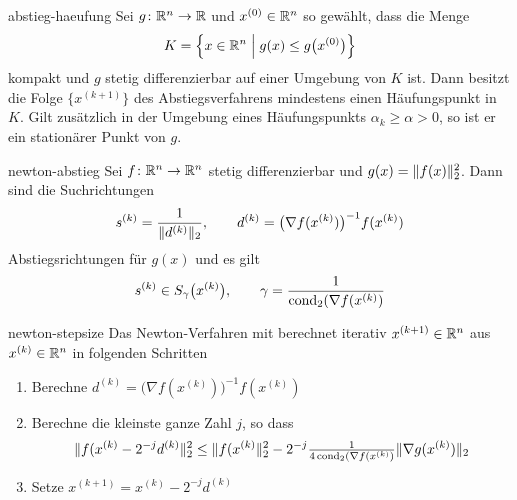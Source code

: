 \begin{Satz}{abstieg-haeufung}
  Sei $g\colon \mathbb R^n\to \mathbb R$ und $x^{(0)} \in\mathbb R^n$ so gewählt, dass die Menge
  \begin{gather}
    K = \Bigl\{x\in\mathbb R^n \; \Big| \; g(x) \le g\bigl(x^{(0)}\bigr) \Bigr\}
  \end{gather}
  kompakt und $g$ stetig differenzierbar auf einer Umgebung von $K$
  ist. Dann besitzt die Folge $\{x^{(k+1)}\}$ des Abstiegsverfahrens
  mindestens einen Häufungspunkt in $K$. Gilt zusätzlich in der
  Umgebung eines Häufungspunkts $\alpha_k \ge \alpha>0$, so ist er
  ein stationärer Punkt von $g$.
\end{Satz}

\begin{Lemma}{newton-abstieg}
  Sei $f\colon \mathbb R^n\to \mathbb R^n$ stetig differenzierbar und
  $g(x) = \lVert f(x)\rVert_2^2$.  Dann sind die Suchrichtungen
  \begin{gather}
    s^{(k)} = \frac1{\lVert d^{(k)}\rVert_2},
    \qquad d^{(k)} = \bigl(\nabla f(x^{(k)})\bigr)^{-1}f(x^{(k)})
  \end{gather}
  Abstiegsrichtungen für $g(x)$ und es gilt
  \begin{gather}
    s^{(k)} \in S_\gamma\bigl(x^{(k)}\bigr),
    \qquad
    \gamma = \frac{1}{\operatorname{cond}_2(\nabla f(x^{(k)})}
  \end{gather}
\end{Lemma}

\begin{Definition}{newton-stepsize}
  Das Newton-Verfahren mit  berechnet iterativ
  $x^{(k+1)}\in \mathbb R^n$ aus $x^{(k)}\in \mathbb R^n$ in folgenden Schritten
  \begin{enumerate}
  \item Berechne $d^{(k)} = \bigl(\nabla f(x^{(k)})\bigr)^{-1}f(x^{(k)})$
  \item Berechne die kleinste ganze Zahl $j$, so dass
    \begin{gather}
      \lVert f(x^{(k)}-2^{-j} d^{(k)}\rVert_2^2
      \le \lVert f(x^{(k)}\rVert_2^2 - 2^{-j}
      \tfrac{1}{4\operatorname{cond}_2(\nabla f(x^{(k)})} \lVert\nabla g(x^{(k)})\rVert_2
    \end{gather}
    \item Setze $x^{(k+1)}=x^{(k)}-2^{-j} d^{(k)}$
  \end{enumerate}
\end{Definition}

